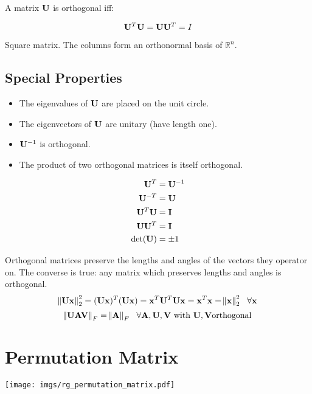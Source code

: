 A matrix $\mathbf{U}$ is orthogonal iff:

\begin{equation}
\mathbf{U}^T \mathbf{U} = \mathbf{U} \mathbf{U}^T = I
\end{equation}

Square matrix. The columns form an orthonormal basis of $\mathbb{R}^n$.



\subsection*{Special Properties}

\begin{itemize}
\item The eigenvalues of $\mathbf{U}$ are placed on the unit circle.
\item The eigenvectors of $\mathbf{U}$ are unitary (have length one).
\item $\mathbf{U}^{-1}$ is orthogonal.
\item The product of two orthogonal matrices is itself orthogonal.
\end{itemize}

\begin{align}
\mathbf{U}^T     &= \mathbf{U}^{-1} \\
\mathbf{U}^{-T}  &= \mathbf{U}      \\
\mathbf{U}^T\mathbf{U}  &= \mathbf{I}      \\
\mathbf{U}\mathbf{U}^T  &= \mathbf{I}      \\
\det(\mathbf{U}) &= \pm1
\end{align}



Orthogonal matrices preserve the lengths and angles of the vectors they operator on. The converse is true: any matrix which preserves lengths and angles is orthogonal.
\begin{equation}
\norm{\mathbf{U} \mathbf{x}}^2_2=(\mathbf{U}\mathbf{x})^T(\mathbf{U}\mathbf{x})=\mathbf{x}^T\mathbf{U}^T\mathbf{U}\mathbf{x}=\mathbf{x}^T\mathbf{x}=\norm{\mathbf{x}}^2_2~~\forall \mathbf{x}
\end{equation}
\begin{equation}
\norm{\mathbf{U} \mathbf{A} \mathbf{V}}_F=\norm{\mathbf{A}}_F~~\forall \mathbf{A},\mathbf{U},\mathbf{V}~\textrm{with}~\mathbf{U},\mathbf{V} \textrm{orthogonal}
\end{equation}



\section{Permutation Matrix}
\begin{center}
\texttt{[image: imgs/rg\_permutation\_matrix.pdf]}
\end{center}

